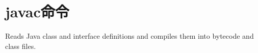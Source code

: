 \section{javac命令}
\label{chap:tools_javac}

Reads Java class and interface definitions and compiles them into bytecode and class files.

\begin{lstlisting}[language=cshell]
    
\end{lstlisting}